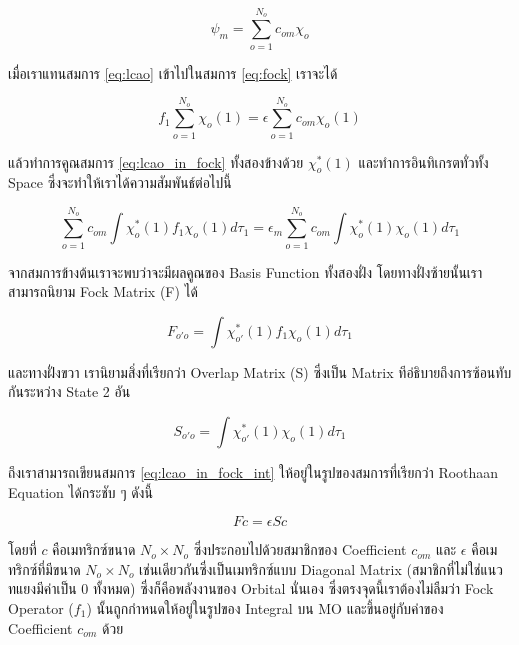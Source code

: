 \begin{equation}
    \label{eq:lcao}
    \psi_{m} = \sum^{N_{o}}_{o=1} c_{om} \chi_{o} 
\end{equation}

เมื่อเราแทนสมการ \ref{eq:lcao} เข้าไปในสมการ \ref{eq:fock} เราจะได้

\begin{equation}
    \label{eq:lcao_in_fock}
    f_{1} \sum^{N_{o}}_{o=1} \chi_{o}(1) = \epsilon \sum^{N_{o}}_{o=1} c_{om} \chi_{o}(1)
\end{equation}

แล้วทำการคูณสมการ \ref{eq:lcao_in_fock} ทั้งสองข้างด้วย $\chi^{*}_{o}(1)$ และทำการอินทิเกรตทั่วทั้ง Space ซึ่งจะทำให้เราได้ความสัมพันธ์ต่อไปนี้

\begin{equation}
    \label{eq:lcao_in_fock_int}
    \sum^{N_{o}}_{o=1} c_{om} \int \chi^{*}_{o}(1) f_{1} \chi_{o}(1) d\tau_{1} =
    \epsilon_{m} \sum^{N_{o}}_{o=1} c_{om} \int \chi^{*}_{o}(1) \chi_{o}(1) d\tau_{1}
\end{equation}

จากสมการข้างต้นเราจะพบว่าจะมีผลคูณของ Basis Function ทั้งสองฝั่ง โดยทางฝั่งซ้ายนั้นเราสามารถนิยาม Fock Matrix (F) ได้

\begin{equation}
    F_{o'o} = \int \chi^{*}_{o'}(1) f_{1} \chi_{o}(1) d\tau_{1}
\end{equation}

และทางฝั่งขวา เรานิยามสิ่งที่เรียกว่า Overlap Matrix (S) ซึ่งเป็น Matrix ทีอ่ธิบายถึงการซ้อนทับกันระหว่าง State 2 อัน

\begin{equation}
    S_{o'o} = \int \chi^{*}_{o'}(1) \chi_{o}(1) d\tau_{1}
\end{equation}

ถึงเราสามารถเขียนสมการ \ref{eq:lcao_in_fock_int} ให้อยู่ในรูปของสมการที่เรียกว่า Roothaan Equation ได้กระชับ ๆ ดังนี้

\begin{equation}
    \label{eq:roothaan}
    F c = \epsilon S c
\end{equation}

โดยที่ $c$ คือเมทริกซ์ขนาด $N_{o} \times N_{o}$ ซึ่งประกอบไปด้วยสมาชิกของ Coefficient $c_{om}$ และ $\epsilon$ คือเมทริกซ์ที่มีขนาด
$N_{o} \times N_{o}$ เช่นเดียวกันซึ่งเป็นเมทริกซ์แบบ Diagonal Matrix (สมาชิกที่ไม่ใช่แนวทแยงมีค่าเป็น 0 ทั้งหมด) ซึ่งก็คือพลังงานของ Orbital นั่นเอง
ซึ่งตรงจุดนี้เราต้องไม่ลืมว่า Fock Operator ($f_{1}$) นั้นถูกกำหนดให้อยู่ในรูปของ Integral บน MO และขึ้นอยู่กับค่าของ Coefficient $c_{om}$ ด้วย

